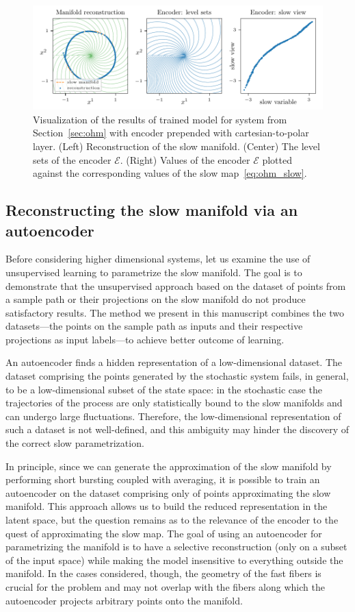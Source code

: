 \documentclass{article}
\newcommand{\enc}{\mathcal{E}} %
\begin{document}
\begin{figure}
    \centering
    \includegraphics[width=\textwidth]{figs/ohm2d_polar_recon_fibers.pdf}
    \caption{Visualization of the results of trained model for system from Section~\ref{sec:ohm} with encoder prepended with cartesian-to-polar layer. (Left) Reconstruction of the slow manifold. (Center) The level sets of the encoder $\enc$. (Right) Values of the encoder $\enc$ plotted against the corresponding values of the slow map~\eqref{eq:ohm_slow}.}
    \label{fig:ohm2d_polar_recon_fibers}
\end{figure}

\subsection{Reconstructing the slow manifold via an autoencoder}\label{sec:autoencoder}
Before considering higher dimensional systems, let us examine the use of unsupervised learning to parametrize the slow manifold. The goal is to demonstrate that the unsupervised approach based on the dataset of points from a sample path or their projections on the slow manifold do not produce satisfactory results. The method we present in this manuscript combines the two datasets---the points on the sample path as inputs and their respective projections as input labels---to achieve better outcome of learning.

An autoencoder finds a hidden representation of a low-dimensional dataset. The dataset comprising the points generated by the stochastic system fails, in general, to be a low-dimensional subset of the state space: in the stochastic case the trajectories of the process are only statistically bound to the slow manifolds and can undergo large fluctuations. Therefore, the low-dimensional representation of such a dataset is not well-defined, and this ambiguity may hinder the discovery of the correct slow parametrization.

In principle, since we can generate the approximation of the slow manifold by performing short bursting coupled with averaging, it is possible to train an autoencoder on the dataset comprising only of points approximating the slow manifold. This approach allows us to build the reduced representation in the latent space, but the question remains as to the relevance of the encoder to the quest of approximating the slow map. The goal of using an autoencoder for parametrizing the manifold is to have a selective reconstruction (only on a subset of the input space) while making the model insensitive to everything outside the manifold. In the cases considered, though, the geometry of the fast fibers is crucial for the problem and may not overlap with the fibers along which the autoencoder projects arbitrary points onto the manifold.
\end{document}
